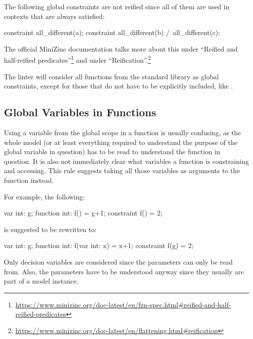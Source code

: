 \documentclass[a4paper,12pt]{article}
\begin{document}
The following global constraints are not reified since all of them are used in contexts that are always satisfied:
\begin{mznnobreak}
constraint all_different(a);
constraint all_different(b) /\ all_different(c);
\end{mznnobreak}
The official MiniZinc documentation talks more about this under ``Reified and half-reified
predicates''\footnote{\url{https://www.minizinc.org/doc-latest/en/fzn-spec.html\#reified-and-half-reified-predicates}}
and under ``Reification''.\footnote{\url{https://www.minizinc.org/doc-latest/en/flattening.html\#reification}}

The linter will consider all functions from the standard library as global constraints,
except for those that do not have to be explicitly included, like .

\subsection{Global Variables in Functions}\label{sec:rule:globalfun}
Using a variable from the global scope in a function is usually confusing, as the whole model
(or at least everything required to understand the purpose of the global variable in
question) has to be read to understand the function in question. It is also not
immediately clear what variables a function is constraining and accessing. This rule
suggests taking all those variables as arguments to the function instead.

For example, the following:
\begin{mznnobreak}
var int: g;
function int: f() = g+1;
constraint f() = 2;
\end{mznnobreak}
is suggested to be rewritten to:
\begin{mznnobreak}
var int: g;
function int: f(var int: x) = x+1;
constraint f(g) = 2;
\end{mznnobreak}

Only decision variables are considered since the parameters can only be read from. Also, the parameters have to be understood anyway since they
usually are part of a model instance. 
\end{document}
